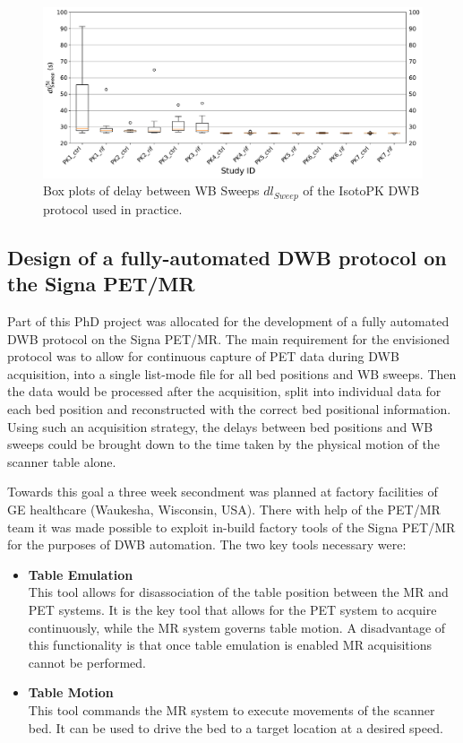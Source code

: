 %
\begin{figure} [ht!]
\centering
\includegraphics[scale=0.5,angle=0]{3_Results/3_1_DWB_Optimization/figures/3_1_BoxPlots_DTSweeps.pdf}
\caption{Box plots of delay between WB Sweeps $dl_{Sweep}$ of the IsotoPK DWB protocol used in practice.}
\label{fig3_1:BoxPlots_sweeps}
\end{figure}
%
%
%
\subsection{Design of a fully-automated DWB protocol on the Signa PET/MR}
Part of this PhD project was allocated for the development of a fully automated DWB protocol on the Signa PET/MR. 
The main requirement for the envisioned protocol was to allow for continuous capture of PET data during DWB acquisition, into a single list-mode file for all bed positions and WB sweeps. Then the data would be processed after the acquisition, split into individual data for each bed position and reconstructed with the correct bed positional information. Using such an acquisition strategy, the delays between bed positions and WB sweeps could be brought down to the time taken by the physical motion of the scanner table alone. 

Towards this goal a three week secondment was planned at factory facilities of GE healthcare (Waukesha, Wisconsin, USA). %
There with help of the PET/MR team it was made possible to exploit in-build factory tools of the Signa PET/MR for the purposes of DWB automation. The two key tools necessary were: 
\begin{itemize}
    \item\textbf{Table Emulation} \\
    This tool allows for disassociation of the table position between the MR and PET systems. It is the key tool that allows for the PET system to acquire continuously, while the MR system governs table motion. A disadvantage of this functionality is that once table emulation is enabled MR acquisitions cannot be performed.%
    \item\textbf{Table Motion} \\
    This tool commands the MR system to execute movements of the scanner bed. It can be used to drive the bed to a target location at a desired speed. 
\end{itemize}


